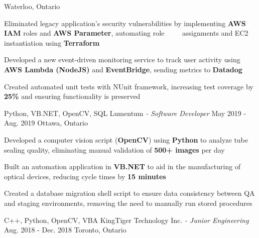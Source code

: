 \begin{siderules}
\begin{cventries}
    {Waterloo, Ontario}
    {
      \begin{cvitems}
        \item {Eliminated legacy application’s security vulnerabilities by implementing \textbf{AWS IAM} roles and \textbf{AWS Parameter}, automating role $\>$ $\>$ $\>$ $\>$ assignments and EC2 instantiation using \textbf{Terraform}}
        \item {Developed a new event-driven monitoring service to track user activity using \textbf{AWS Lambda (NodeJS)} and \textbf{EventBridge}, sending metrics to \textbf{Datadog}}
        \item {Created automated unit tests with NUnit framework, increasing test coverage by \textbf{25\%} and ensuring functionality is preserved}
      \end{cvitems}
    }
    \cventry
      {Python, VB.NET, OpenCV, SQL}
      {Lumentum\hspace{0.15em} \bodyfontlight\itshape{- Software Developer}}
      {May 2019 - Aug. 2019}
      {Ottawa, Ontario}
      {
        \begin{cvitems}
          \item {Developed a computer vision script (\textbf{OpenCV}) using \textbf{Python} to analyze tube sealing quality, eliminating manual validation of \textbf{500+ images} per day}
          \item {Built an automation application in \textbf{VB.NET} to aid in the manufacturing of optical devices, reducing cycle times by \textbf{15 minutes}}
          \item {Created a database migration shell script to ensure data consistency between QA and staging environments, removing the need to manually run stored procedures}
        \end{cvitems}
      }
    \cventry
      {C++, Python, OpenCV, VBA}
      {KingTiger Technology Inc.\hspace{0.15em} \bodyfontlight\itshape{- Junior Engineering}}
      {Aug. 2018 - Dec. 2018}
      {Toronto, Ontario}
      {
        \begin{cvitems}

\end{cvitems}}
\end{cventries}
\end{siderules}
